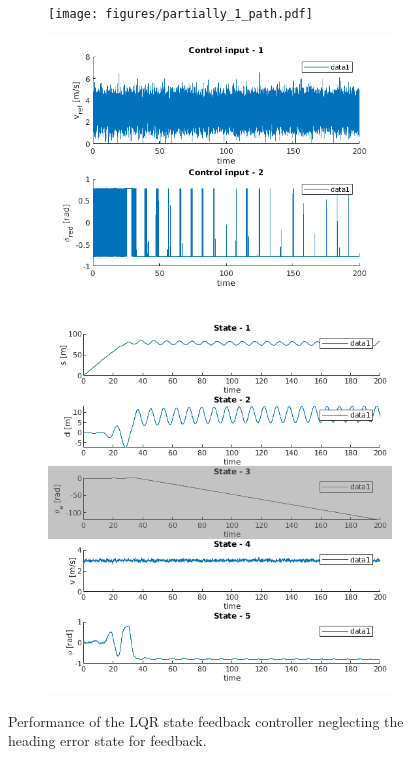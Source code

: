 \begin{figure}[h]
	\begin{minipage}{0.4\textwidth}
		\begin{subfigure}{\textwidth}
				\texttt{[image: figures/partially\_1\_path.pdf]}
		\end{subfigure}
		\begin{subfigure}{\textwidth}
				\includegraphics[width=\textwidth]{figures/partially_1_inputs.png}
		\end{subfigure}
	\end{minipage}
	\begin{subfigure}{.59\textwidth}
		\includegraphics[width=\textwidth]{figures/partially_1_states.png}
	\end{subfigure}
	\caption{Performance of the LQR state feedback controller neglecting the heading error state for feedback.}
	\label{fig:partially_states}
\end{figure}

